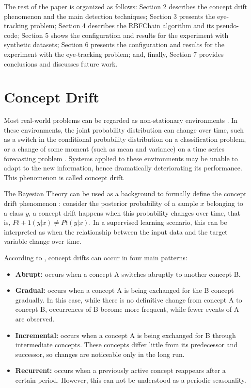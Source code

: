 \documentclass[preprint,12pt]{elsarticle}
\begin{document}
The rest of the paper is organized as follows:
Section 2 describes the concept drift phenomenon and the main detection techniques;
Section 3 presents the eye-tracking problem;
Section 4 describes the RBFChain algorithm and its pseudo-code;
Section 5 shows the configuration and results for the experiment with synthetic datasets;
Section 6 presents the configuration and results for the experiment with the eye-tracking problem; and, finally, Section 7 provides conclusions and discusses future work.

\section{Concept Drift}
\label{sec:concept_drift}

Most real-world problems can be regarded as non-stationary environments \cite{Gama:2014:DAF:2670967.2670971}.
In these environments, the joint probability distribution can change over time,
such as a switch in the conditional probability distribution on a classification problem,
or a change of some moment (such as mean and variance) on a time series forecasting problem \cite{tsymbal2004problem}.
%
Systems applied to these environments may be unable to adapt to the new information,
hence dramatically deteriorating its performance.
This phenomenon is called concept drift.

The Bayesian Theory can be used as a background to formally define the concept drift phenomenon \cite{Elwell:2011}:
consider the posterior probability of a sample $x$ belonging to a class $y$, a concept drift happens when this probability changes over time, that is, $Pt + 1 (y | x) \neq Pt (y | x)$. In a supervised learning scenario, this can be interpreted as when the relationship between the input data and the target variable change over time.

According to \cite{tsymbal2004problem, Gama:2014:DAF:2670967.2670971}, concept drifts can occur in four main patterns:

\begin{itemize}
    \item \textbf{Abrupt:} occurs when a concept A switches abruptly to another concept B.
    \item \textbf{Gradual:} occurs when a concept A is being exchanged for the B concept gradually. In this case, while there is no definitive change from concept A to concept B, occurrences of B become more frequent, while fewer events of A are observed.
    \item \textbf{Incremental:} occurs when a concept A is being exchanged for B through intermediate concepts.  These concepts differ little from its predecessor and successor, so changes are noticeable only in the long run.
    \item \textbf{Recurrent:} occurs when a previously active concept reappears after a certain period. However, this can not be understood as a periodic seasonality.
\end{itemize}
\end{document}
